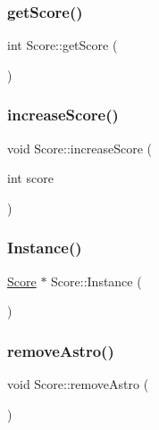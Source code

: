 \mbox{\label{class_score_a8627c93270c188a3fd28a25b1d07a9e7}} 
\subsubsection{\texorpdfstring{get\+Score()}{getScore()}}
{\footnotesize\ttfamily int Score\+::get\+Score (\begin{DoxyParamCaption}{ }\end{DoxyParamCaption})}

\mbox{\label{class_score_a9be80e91f6252cbb7c59d5212280e00f}} 
\subsubsection{\texorpdfstring{increase\+Score()}{increaseScore()}}
{\footnotesize\ttfamily void Score\+::increase\+Score (\begin{DoxyParamCaption}\item[{int}]{score }\end{DoxyParamCaption})}

\mbox{\label{class_score_a7d5516454642a247be184d5063404d04}} 
\subsubsection{\texorpdfstring{Instance()}{Instance()}}
{\footnotesize\ttfamily \hyperlink{class_score}{Score} $\ast$ Score\+::\+Instance (\begin{DoxyParamCaption}{ }\end{DoxyParamCaption})\hspace{0.3cm}{\ttfamily [static]}}

\mbox{\label{class_score_ac826af8103f602c71d75d36aeecdff35}} 
\subsubsection{\texorpdfstring{remove\+Astro()}{removeAstro()}}
{\footnotesize\ttfamily void Score\+::remove\+Astro (\begin{DoxyParamCaption}{ }\end{DoxyParamCaption})}

